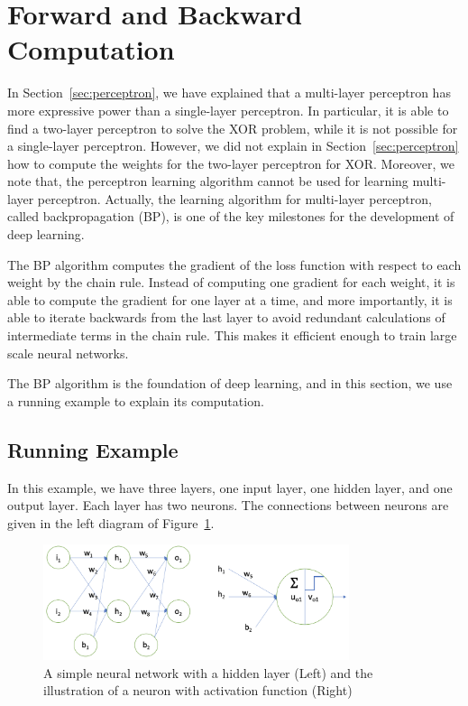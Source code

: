 \section{Forward and Backward Computation}

In Section~\ref{sec:perceptron}, we have explained that a multi-layer perceptron has more expressive power than a single-layer perceptron. In particular, it is able to find a two-layer perceptron to solve the XOR problem, while it is not possible for a single-layer perceptron. However, we did not explain in  Section~\ref{sec:perceptron} how to compute the weights for the two-layer perceptron for XOR. Moreover, we note that, the perceptron learning algorithm cannot be used for learning multi-layer perceptron. Actually, the learning algorithm for multi-layer perceptron, called backpropagation (BP), is one of the key milestones for the development of deep learning. 

The BP algorithm computes the gradient of the loss function with respect to each weight by the chain rule. Instead of computing one gradient for each weight, it is able to compute
the gradient for one layer at a time, and more importantly, it is able to iterate backwards from the last layer to avoid redundant calculations of intermediate terms in the chain rule. This makes it efficient enough to train large scale neural networks. 

The BP algorithm is the foundation of deep learning, and in this section, we use a running example to explain its computation. 

\subsection*{Running Example}

In this example, we have three layers, one input layer, one hidden layer, and one output layer. Each layer has two neurons. The connections between neurons are given in the left diagram of Figure~\ref{fig:network}. 

\begin{figure}[!htbp]
    \centering
    \includegraphics[width=0.8\textwidth]{images/deepLearning/propagation/network.png}
    \caption{A simple neural network with a hidden layer (Left) and the illustration of a neuron with activation function (Right)}
    \label{fig:network}
\end{figure}

